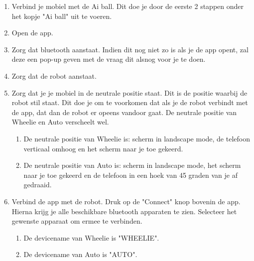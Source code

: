 \documentclass[12pt,a4paper]{article}
\begin{document}
\begin{enumerate}
	\item Verbind je mobiel met de Ai ball. Dit doe je door de eerste 2 stappen onder het kopje "Ai ball" uit te voeren.
	\item Open de app.
	\item Zorg dat bluetooth aanstaat. Indien dit nog niet zo is als je de app opent, zal deze een pop-up geven met de vraag dit alsnog voor je te doen. 
	\item Zorg dat de robot aanstaat. 
	\item Zorg dat je je mobiel in de neutrale positie staat. Dit is de positie waarbij de robot stil staat. Dit doe je om te voorkomen dat als je de robot verbindt met de app, dat dan de robot er opeens vandoor gaat. De neutrale positie van Wheelie en Auto verscheelt wel. 
	\begin{enumerate}
		\item De neutrale positie van Wheelie is: scherm in landscape mode, de telefoon verticaal omhoog en het scherm naar je toe gekeerd.
		\item De neutrale positie van Auto is: scherm in landscape mode, het scherm naar je toe gekeerd en de telefoon in een hoek van 45 graden van je af gedraaid. 
	\end{enumerate} 
	\item Verbind de app met de robot. Druk op de "Connect" knop bovenin de app. Hierna krijg je alle beschikbare bluetooth apparaten te zien. Selecteer het gewenste apparaat om ermee te verbinden.
	\begin{enumerate}
		\item De devicename van Wheelie is "WHEELIE".
		\item De devicename van Auto is "AUTO".
	\end{enumerate}
\end{enumerate}
\end{document}
